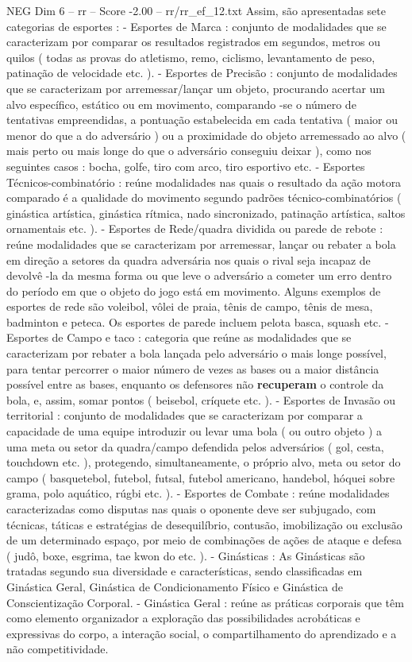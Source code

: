 \begin{textsample}{NEG Dim 6 – rr – Score -2.00 – rr/rr\_ef\_12.txt}
Assim, são apresentadas sete categorias de esportes : - Esportes de Marca : conjunto de modalidades que se caracterizam por comparar os resultados registrados em segundos, metros ou quilos ( todas as provas do atletismo, remo, ciclismo, levantamento de peso, patinação de velocidade etc. ). - Esportes de Precisão : conjunto de modalidades que se caracterizam por arremessar/lançar um objeto, procurando acertar um alvo específico, estático ou em movimento, comparando -se o número de tentativas empreendidas, a pontuação estabelecida em cada tentativa ( maior ou menor do que a do adversário ) ou a proximidade do objeto arremessado ao alvo ( mais perto ou mais longe do que o adversário conseguiu deixar ), como nos seguintes casos : bocha, golfe, tiro com arco, tiro esportivo etc. - Esportes Técnicos-combinatório : reúne modalidades nas quais o resultado da ação motora comparado é a qualidade do movimento segundo padrões técnico-combinatórios ( ginástica artística, ginástica rítmica, nado sincronizado, patinação artística, saltos ornamentais etc. ). - Esportes de Rede/quadra dividida ou parede de rebote : reúne modalidades que se caracterizam por arremessar, lançar ou rebater a bola em direção a setores da quadra adversária nos quais o rival seja incapaz de devolvê -la da mesma forma ou que leve o adversário a cometer um erro dentro do período em que o objeto do jogo está em movimento.
Alguns exemplos de esportes de rede são voleibol, vôlei de praia, tênis de campo, tênis de mesa, badminton e peteca.
Os esportes de parede incluem pelota basca, squash etc. - Esportes de Campo e taco : categoria que reúne as modalidades que se caracterizam por rebater a bola lançada pelo adversário o mais longe possível, para tentar percorrer o maior número de vezes as bases ou a maior distância possível entre as bases, enquanto os defensores não \textbf{recuperam} o controle da bola, e, assim, somar pontos ( beisebol, críquete etc. ). - Esportes de Invasão ou territorial : conjunto de modalidades que se caracterizam por comparar a capacidade de uma equipe introduzir ou levar uma bola ( ou outro objeto ) a uma meta ou setor da quadra/campo defendida pelos adversários ( gol, cesta, touchdown etc. ), protegendo, simultaneamente, o próprio alvo, meta ou setor do campo ( basquetebol, futebol, futsal, futebol americano, handebol, hóquei sobre grama, polo aquático, rúgbi etc. ). - Esportes de Combate : reúne modalidades caracterizadas como disputas nas quais o oponente deve ser subjugado, com técnicas, táticas e estratégias de desequilíbrio, contusão, imobilização ou exclusão de um determinado espaço, por meio de combinações de ações de ataque e defesa ( judô, boxe, esgrima, tae kwon do etc. ). - Ginásticas : As Ginásticas são tratadas segundo sua diversidade e características, sendo classificadas em Ginástica Geral, Ginástica de Condicionamento Físico e Ginástica de Conscientização Corporal. - Ginástica Geral : reúne as práticas corporais que têm como elemento organizador a exploração das possibilidades acrobáticas e expressivas do corpo, a interação social, o compartilhamento do aprendizado e a não competitividade.

\end{textsample}
